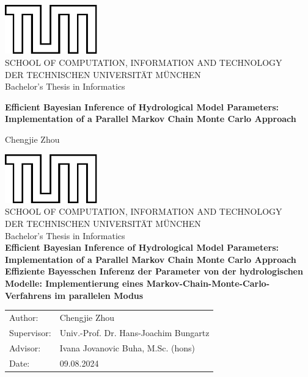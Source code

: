 \documentclass[11pt,
               a4paper,
               bibtotoc,
               idxtotoc,
               headsepline,
               footsepline,
               footexclude,
               BCOR12mm,
               DIV13,
               openany,   %
               ]
               {scrbook}
\def\doctype{Bachelor's Thesis\xspace}
\def\studyProgram{Informatics}
\def\title{Efficient Bayesian Inference of Hydrological Model Parameters: Implementation of a Parallel Markov Chain Monte Carlo Approach}
\def\titleGer{Effiziente Bayesschen Inferenz der Parameter von der hydrologischen Modelle: Implementierung eines Markov-Chain-Monte-Carlo-Verfahrens im parallelen Modus}
\def\author{Chengjie Zhou}
\def\supervisor{Univ.-Prof. Dr. Hans-Joachim Bungartz}
\def\advisor{Ivana Jovanovic Buha, M.Sc. (hons)}
\def\date{09.08.2024}
\begin{document}
\frontmatter

\def\bcorcor{0.15cm}
\addtolength{\hoffset}{\bcorcor}
\thispagestyle{empty}
\vspace{4cm}
\begin{center}
    \includegraphics[width=4cm]{templateStuff/tumlogo.pdf}\\[5mm]
    \huge SCHOOL OF COMPUTATION, INFORMATION AND TECHNOLOGY\\[5mm]
    \large DER TECHNISCHEN UNIVERSITÄT MÜNCHEN\\[24mm]

    {\Large \doctype in \studyProgram}\\[20mm]
    {\huge\bf \title\par}
    \vspace{15mm}
    {\LARGE  \author}
\end{center}

\cleardoubleemptypage


\def\bcorcor{0.15cm}
\addtolength{\hoffset}{\bcorcor}
\thispagestyle{empty}
\vspace{10mm}
\begin{center}
    \includegraphics[width=4cm]{templateStuff/tumlogo.pdf}\\[5mm]
	\huge SCHOOL OF COMPUTATION, INFORMATION AND TECHNOLOGY\\[5mm]
	\large DER TECHNISCHEN UNIVERSITÄT MÜNCHEN\\[24mm]
	{\Large \doctype in \studyProgram}\\[20mm]
	{\LARGE\bf \title}\\[10mm]
	{\LARGE\bf \titleGer}\\[10mm]
	\begin{tabular}{ll}
		\Large Author:      	& \Large \author \\[2mm]
		\Large Supervisor:  	& \Large \supervisor\\[2mm]
		\Large Advisor:			& \Large \advisor\\[2mm]
		\Large Date:       		& \Large \date
	\end{tabular}
\end{center}
\end{document}
